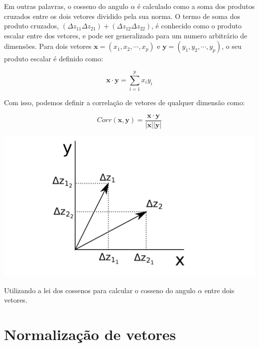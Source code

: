\documentclass[portuges,]{tufte-handout}
\begin{document}
Em outras palavras, o cosseno do angulo \(\alpha\) é calculado como a
soma dos produtos cruzados entre os dois vetores dividido pela sua
norma. O termo de soma dos produto cruzados,
\((\Delta z_{11} \Delta z_{21}) + (\Delta z_{12} \Delta z_{22})\), é
conhecido como o produto escalar entre dos vetores, e pode ser
generalizado para um numero arbitrário de dimensões. Para dois vetores
\(\mathbf{x} = (x_1, x_2, \cdots, x_p)\) e
\(\mathbf{y} = (y_1, y_2, \cdots, y_p)\), o seu produto escalar é
definido como:

\[
\mathbf{x} \cdot \mathbf{y} = \sum_{i=1}^p x_iy_i
\]

Com isso, podemos definir a correlação de vetores de qualquer dimensão
como:

\[
Corr(\mathbf{x}, \mathbf{y}) = \frac{\mathbf{x} \cdot \mathbf{y}}{|\mathbf{x}||\mathbf{y}|}
\]

\begin{marginfigure}
\includegraphics{./figuras/leidoscossenos.png}
\caption{Utilizando a lei dos cossenos para calcular o cosseno
do angulo \(\alpha\) entre dois vetores.}
\label{leidoscossenos}
\end{marginfigure}

\section{Normalização de vetores}\label{normalizauxe7uxe3o-de-vetores}
\end{document}
